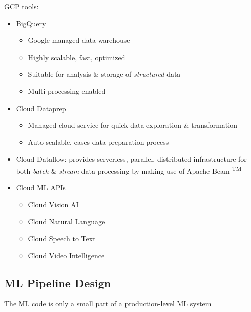 \documentclass[10pt,landscape,letterpaper]{cheatsheet}
\begin{document}
\begin{multicols}{3}
GCP tools:
\begin{itemize}
    \item BigQuery
    \begin{itemize}
        \item Google-managed data warehouse
        \item Highly scalable, fast, optimized
        \item Suitable for analysis \& storage of \textit{structured} data
        \item Multi-processing enabled
    \end{itemize}
    \item Cloud Dataprep
    \begin{itemize}
        \item Managed cloud service for quick data exploration \& transformation
        \item Auto-scalable, eases data-preparation process
    \end{itemize}
    \item Cloud Dataflow: provides serverless, parallel, distributed infrastructure for both \emph{batch} \& \emph{stream} data processing by making use of Apache Beam \textsuperscript{TM}
    \item Cloud ML APIs
    \begin{itemize}
        \item Cloud Vision AI
        \item Cloud Natural Language
        \item Cloud Speech to Text
        \item Cloud Video Intelligence
    \end{itemize}
\end{itemize}

\subsection{ML Pipeline Design}

The ML code is only a small part of a \href{https://cloud.google.com/products/operations}{production-level ML system}


\end{multicols}
\end{document}
